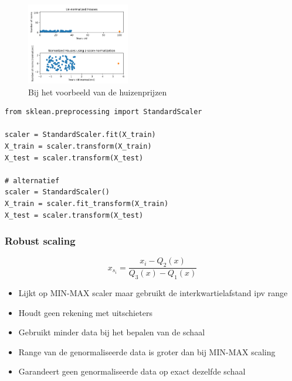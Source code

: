 \documentclass{article}
\begin{document}
\begin{figure}[H]
    \centering
    \includegraphics[width=0.4\textwidth]{standard-scaling-houses.png}
    \caption{Bij het voorbeeld van de huizenprijzen}
\end{figure}


\begin{verbatim}
from sklean.preprocessing import StandardScaler

scaler = StandardScaler.fit(X_train)
X_train = scaler.transform(X_train)
X_test = scaler.transform(X_test)

# alternatief
scaler = StandardScaler()
X_train = scaler.fit_transform(X_train)
X_test = scaler.transform(X_test)
\end{verbatim}

\subsubsection{Robust scaling}

\begin{equation}
x_{s_i} = \frac{x_i - Q_2(x)}{Q_3(x) - Q_1(x)}
\end{equation}

\begin{itemize}
    \item Lijkt op MIN-MAX scaler maar gebruikt de interkwartielafstand ipv range
    \item Houdt geen rekening met uitschieters
    \item Gebruikt minder data bij het bepalen van de schaal
    \item Range van de genormaliseerde data is groter dan bij MIN-MAX scaling
    \item Garandeert geen genormaliseerde data op exact dezelfde schaal
\end{itemize}
\end{document}

